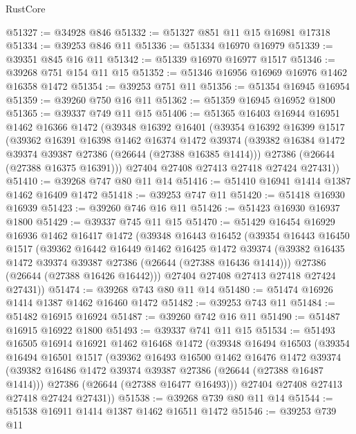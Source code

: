 \begin{lexlean}{RustCore}
\begin{coremodule}
@51327 := @34928 @846
@51332 := @51327 @851 @11 @15 @16981 @17318
@51334 := @39253 @846 @11
@51336 := @51334 @16970 @16979
@51339 := @39351 @845 @16 @11
@51342 := @51339 @16970 @16977 @1517
@51346 := @39268 @751 @154 @11 @15
@51352 := @51346 @16956 @16969 @16976 @1462 @16358 @1472
@51354 := @39253 @751 @11
@51356 := @51354 @16945 @16954
@51359 := @39260 @750 @16 @11
@51362 := @51359 @16945 @16952 @1800
@51365 := @39337 @749 @11 @15
@51406 := @51365
    @16403
    @16944
    @16951
    @1462
    @16366
    @1472
    (@39348
      @16392
      @16401
      (@39354
        @16392
        @16399
        @1517
        (@39362
          @16391
          @16398
          @1462
          @16374
          @1472
          @39374
          (@39382 @16384 @1472 @39374 @39387 @27386 (@26644 (@27388 @16385 @1414)))
          @27386
          (@26644 (@27388 @16375 @16391)))
        @27404
        @27408
        @27413
        @27418
        @27424
        @27431))
@51410 := @39268 @747 @80 @11 @14
@51416 := @51410 @16941 @1414 @1387 @1462 @16409 @1472
@51418 := @39253 @747 @11
@51420 := @51418 @16930 @16939
@51423 := @39260 @746 @16 @11
@51426 := @51423 @16930 @16937 @1800
@51429 := @39337 @745 @11 @15
@51470 := @51429
    @16454
    @16929
    @16936
    @1462
    @16417
    @1472
    (@39348
      @16443
      @16452
      (@39354
        @16443
        @16450
        @1517
        (@39362
          @16442
          @16449
          @1462
          @16425
          @1472
          @39374
          (@39382 @16435 @1472 @39374 @39387 @27386 (@26644 (@27388 @16436 @1414)))
          @27386
          (@26644 (@27388 @16426 @16442)))
        @27404
        @27408
        @27413
        @27418
        @27424
        @27431))
@51474 := @39268 @743 @80 @11 @14
@51480 := @51474 @16926 @1414 @1387 @1462 @16460 @1472
@51482 := @39253 @743 @11
@51484 := @51482 @16915 @16924
@51487 := @39260 @742 @16 @11
@51490 := @51487 @16915 @16922 @1800
@51493 := @39337 @741 @11 @15
@51534 := @51493
    @16505
    @16914
    @16921
    @1462
    @16468
    @1472
    (@39348
      @16494
      @16503
      (@39354
        @16494
        @16501
        @1517
        (@39362
          @16493
          @16500
          @1462
          @16476
          @1472
          @39374
          (@39382 @16486 @1472 @39374 @39387 @27386 (@26644 (@27388 @16487 @1414)))
          @27386
          (@26644 (@27388 @16477 @16493)))
        @27404
        @27408
        @27413
        @27418
        @27424
        @27431))
@51538 := @39268 @739 @80 @11 @14
@51544 := @51538 @16911 @1414 @1387 @1462 @16511 @1472
@51546 := @39253 @739 @11

\end{coremodule}
\end{lexlean}
